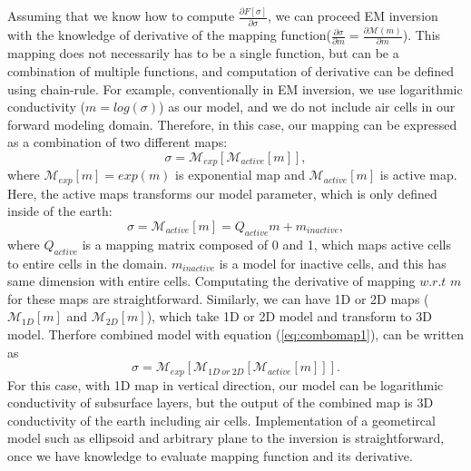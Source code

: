 \documentclass{segabs}
\begin{document}
Assuming that we know how to compute $\frac{\partial F[\sigma]}{\partial \sigma}$, we can proceed EM inversion with the knowledge of derivative of the mapping function($\frac{\partial \sigma}{\partial m} = \frac{\partial \mathcal{M}(m)}{\partial m}$). 
This mapping does not necessarily has to be a single function, but can be a combination of multiple functions, and computation of derivative can be defined using chain-rule. For example, conventionally in EM inversion, we use logarithmic conductivity ($m = log(\sigma)$) as our model, and we do not include air cells in our forward modeling domain. Therefore, in this case, our mapping can be expressed as a combination of two different maps:
\begin{equation}
  \sigma = \mathcal{M}_{exp}[\mathcal{M}_{active}[m]],
  \label{eq:combomap1}
\end{equation}
where $\mathcal{M}_{exp}[m]=exp(m)$ is exponential map and $\mathcal{M}_{active}[m]$ is active map. Here, the active maps transforms our model parameter, which is only defined inside of the earth:
\begin{equation}
  \sigma = \mathcal{M}_{active}[m] = Q_{active}m + m_{inactive},
\end{equation}
where $Q_{active}$ is a mapping matrix composed of 0 and 1, which maps active cells to entire cells in the domain. $m_{inactive}$ is a model for inactive cells, and this has same dimension with entire cells. Computating the derivative of mapping $w.r.t$ $m$ for these maps are straightforward. Similarly, we can have 1D or 2D maps ($\mathcal{M}_{1D}[m]$ and $\mathcal{M}_{2D}[m]$), which take 1D or 2D model and transform to 3D model. Therfore combined model with equation (\ref{eq:combomap1}), can be written as 
\begin{equation}
  \sigma = \mathcal{M}_{exp}[\mathcal{M}_{1D \ or \ 2D}[\mathcal{M}_{active}[m]]].
  \label{eq:combomap2}  
\end{equation}
For this case, with 1D map in vertical direction, our model can be logarithmic conductivity of subsurface layers, but the output of the combined map is 3D conductivity of the earth including air cells. Implementation of a geometircal model such as ellipsoid and arbitrary plane to the inversion is straightforward, once we have knowledge to evaluate mapping function and its derivative. 
\end{document}
